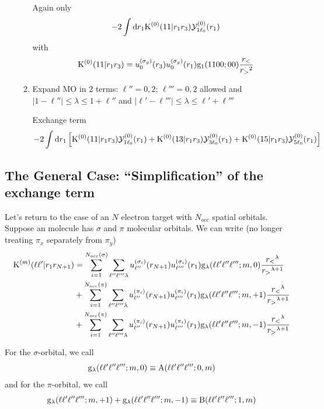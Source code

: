\documentclass[aps,pra,groupedaddress,12pt,
               amsfonts,amssymb,
               preprint
    ]{revtex4}
\begin{document}
\begin{enumerate}
\begin{enumerate}
    Again only
    \begin{equation*}
      -2\int\mathrm{d} r_1\mathrm{K}^{(0)}(11|r_1r_3)\mathcal{Y}_{1\ell_0}^{(0)}(r_1)
    \end{equation*}
    with
    \begin{equation*}
      \mathrm{K}^{(0)}(11|r_1r_3) =
      u_0^{(\sigma_g)}(r_3)u_0^{(\sigma_g)}(r_1)\mathrm{g}_1(1100;00)\dfrac{r_<}{r_>{}^2}
    \end{equation*}
  \item Expand MO in 2 terms: $\ell'' = 0, 2$; $\ell''' = 0, 2$ allowed
    and $|1-\ell''| \leq \lambda \leq 1+\ell''$ and $|\ell'-\ell'''|
    \leq \lambda \leq \ell'+\ell'''$

    Exchange term
    \begin{equation*}
      -2\int\mathrm{d} r_1\left[\mathrm{K}^{(0)}(11|r_1r_3)\mathcal{Y}_{1\ell_0}^{(0)}(r_1)
                        +\mathrm{K}^{(0)}(13|r_1r_3)\mathcal{Y}_{3\ell_0}^{(0)}(r_1)
                        +\mathrm{K}^{(0)}(15|r_1r_3)\mathcal{Y}_{5\ell_0}^{(0)}(r_1)\right]
    \end{equation*}
  \end{enumerate}
\end{enumerate}

\subsection{The General Case: ``Simplification'' of the exchange term}
\label{sec:gener-case:-simpl}
Let's return to the case of an $N$ electron target with $N_{occ}$
spatial orbitals. Suppose an molecule has $\sigma$ and $\pi$ molecular
orbitals. We can write (no longer treating $\pi_x$ separately from
$\pi_y$) 
\begin{equation}
  \label{eq:KEXSP}
  \begin{split}
  \mathrm{K}^{(m)}(\ell\ell'|r_1r_{N+1}) & = \sum_{i=1}^{N_{occ}(\sigma)}\sum_{\ell''\ell'''\lambda}
  u_{\ell''}^{(\sigma_i)}(r_{N+1})u_{\ell'''}^{(\sigma_i)}(r_1)\mathrm{g}_{\lambda}(\ell\ell'\ell''\ell''';m,0)\dfrac{r_<{}^\lambda}{r_>{}^{\lambda+1}} \\
       & + \sum_{i=1}^{N_{occ}(\pi)}\sum_{\ell''\ell'''\lambda}
  u_{\ell''}^{(\pi_i)}(r_{N+1})u_{\ell'''}^{(\pi_i)}(r_1)\mathrm{g}_{\lambda}(\ell\ell'\ell''\ell''';m,+1)\dfrac{r_<{}^\lambda}{r_>{}^{\lambda+1}} \\
       & + \sum_{i=1}^{N_{occ}(\pi)}\sum_{\ell''\ell'''\lambda}
  u_{\ell''}^{(\pi_i)}(r_{N+1})u_{\ell'''}^{(\pi_i)}(r_1)\mathrm{g}_{\lambda}(\ell\ell'\ell''\ell''';m,-1)\dfrac{r_<{}^\lambda}{r_>{}^{\lambda+1}} 
  \end{split}
\end{equation}

For the $\sigma$-orbital, we call
\begin{equation}
  \label{eq:Alm}
  \mathrm{g}_{\lambda}(\ell\ell'\ell''\ell''';m,0) \equiv \mathrm{A}(\ell\ell'\ell''\ell''';0,m)
\end{equation}
and for the $\pi$-orbital, we call
\begin{equation}
  \label{eq:Blm}
  \mathrm{g}_{\lambda}(\ell\ell'\ell''\ell''';m,+1) + \mathrm{g}_{\lambda}(\ell\ell'\ell''\ell''';m,-1) \equiv \mathrm{B}(\ell\ell'\ell''\ell''';1,m)
\end{equation}
\end{document}
